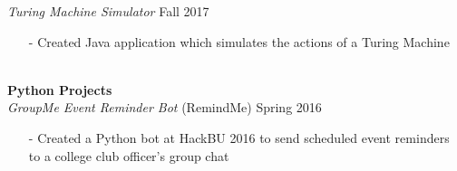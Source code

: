\documentclass[10pt]{article}
\newcommand{\Indent}{\indent\indent}
\begin{document}
            \Indent \small\textit{Turing Machine Simulator} \hfill \small{Fall 2017}\indent\\
                \Indent\begin{minipage}{\dimexpr\textwidth-6cm}
                    \begin{itemize}[noitemsep, topsep=0pt]
                        \item[-] Created Java application which simulates the actions of a Turing Machine
                    \end{itemize}\vspace{0mm}
                \end{minipage}\\
        \indent \small\textbf{Python Projects}\\
            \Indent \small\textit{GroupMe Event Reminder Bot}\small{ (RemindMe)} \hfill \small{Spring 2016}\indent\vspace{0.5mm}\\
                \Indent\begin{minipage}{\dimexpr\textwidth-6cm}
                    \begin{itemize}[noitemsep, topsep=0pt]
                        \item[-] Created a Python bot at HackBU 2016 to send scheduled event reminders to a college club officer's group chat
                    \end{itemize}\vspace{0mm}
                \end{minipage}
\end{document}
